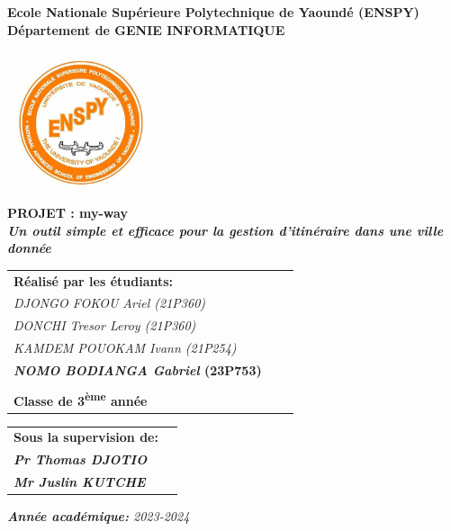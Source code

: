 \begin{titlepage}
  \centering
  {\Large \textbf{Ecole Nationale Supérieure Polytechnique de Yaoundé (ENSPY) \\
  Département de GENIE INFORMATIQUE}\par}
  \vspace{0.2cm}\
    \includegraphics[width=0.30\textwidth]{Images/logo.jpg}\par
  \vspace{0.1cm}

   {\LARGE \textbf{ PROJET : my-way\\\textit{Un outil simple et efficace pour la gestion d'itinéraire dans une ville donnée}}\par}
  \vspace{0.2cm}

  \vspace{0.2cm}
  \vspace{0.10cm}
  \hrulefill\par
  \vspace{0.2cm}
  \begin{table}[!htbp]
    \centering
    \large
    \begin{tabular}{l c c}
      \textbf{Réalisé par les étudiants:}\vspace{0.6cm} & \\
       \textit{DJONGO FOKOU Ariel (21P360) }& \\
       \textit{DONCHI Tresor Leroy (21P360)}& \\
       \textit{KAMDEM POUOKAM Ivann (21P254)}& \\
        \textbf{\textit{NOMO BODIANGA Gabriel} (23P753)}& \\
    \vspace{0.5cm}\\
      \textbf{Classe de 3\textsuperscript{ème} année}
    \end{tabular}
  \end{table}
\hrulefill\par
    \vspace{0.2cm}
      \begin{table}[!htbp]
      \centering
    \large
    \begin{tabular}{l c}
      \textbf{Sous la supervision de:} \vspace{0.35cm}& \\
    \textit{ \textbf{Pr Thomas DJOTIO}}& \\
    \textit{\textbf{Mr Juslin KUTCHE}}& \\
    \end{tabular}
  \end{table}
\noindent \hrulefill\par
\centering \textit{\textbf{Année académique:} 2023-2024}
\end{titlepage}
